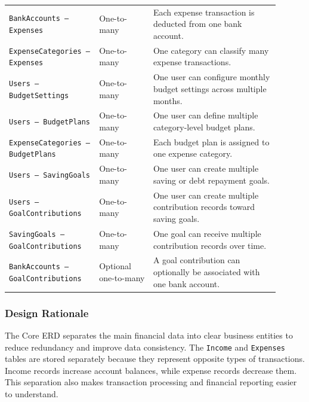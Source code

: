 \documentclass{article}
\begin{document}
\begin{longtable}{
    >{\raggedright\arraybackslash}p{0.30\linewidth}
    >{\centering\arraybackslash}p{0.18\linewidth}
    J{0.42\linewidth}
}
\texttt{BankAccounts -- Expenses}
    & One-to-many
    & Each expense transaction is deducted from one bank account. \\

\texttt{ExpenseCategories -- Expenses}
    & One-to-many
    & One category can classify many expense transactions. \\

\texttt{Users -- BudgetSettings}
    & One-to-many
    & One user can configure monthly budget settings across multiple months. \\

\texttt{Users -- BudgetPlans}
    & One-to-many
    & One user can define multiple category-level budget plans. \\

\texttt{ExpenseCategories -- BudgetPlans}
    & One-to-many
    & Each budget plan is assigned to one expense category. \\

\texttt{Users -- SavingGoals}
    & One-to-many
    & One user can create multiple saving or debt repayment goals. \\

\texttt{Users -- GoalContributions}
    & One-to-many
    & One user can create multiple contribution records toward saving goals. \\

\texttt{SavingGoals -- GoalContributions}
    & One-to-many
    & One goal can receive multiple contribution records over time. \\

\texttt{BankAccounts -- GoalContributions}
    & Optional one-to-many
    & A goal contribution can optionally be associated with one bank account. \\

\end{longtable}
\normalsize

\subsubsection{Design Rationale}

The Core ERD separates the main financial data into clear business entities to reduce redundancy
and improve data consistency. The \texttt{Income} and \texttt{Expenses} tables are stored separately
because they represent opposite types of transactions. Income records increase account balances,
while expense records decrease them. This separation also makes transaction processing and
financial reporting easier to understand.
\end{document}
